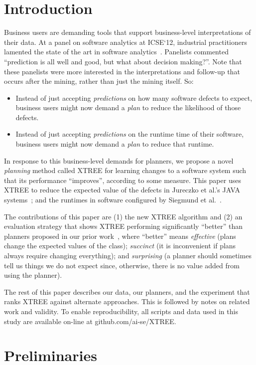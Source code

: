 \documentclass{sig-alternate}
\newcommand{\bi}{\begin{itemize}}
\newcommand{\ei}{\end{itemize}}
\begin{document}
\section{Introduction}
Business users are demanding  tools that support    business-level interpretations of their data. At a panel on software analytics at ICSE`12, industrial practitioners lamented the state of the art in software analytics~\cite{menzies12a}. Panelists commented  ``prediction is all well and good, but what about decision making?''. Note that these panelists were more interested in the interpretations and follow-up that occurs after the mining, rather than just the mining itself. So:
\bi
\item
Instead of just accepting {\em predictions} on how many software defects to expect, business users might now demand a {\em plan} to reduce the likelihood of those defects.
\item
Instead of just accepting {\em predictions} on the runtime time of their software, business users might now demand a {\em plan} to reduce that runtime. 
\ei
In response to this business-level demands for planners,
we propose a novel {\em planning} method called XTREE for learning changes to a software system
such that its performance ``improves'', according to some measure. This paper uses XTREE
to reduce  the expected value of the
defects     in Jureczko et al.'s    JAVA systems~\cite{jureczko10};
and the runtimes   in   software    configured by  Siegmund et al.~\cite{sven12}.

The contributions of this paper are (1)  
    the new XTREE    algorithm and (2) an evaluation strategy that shows
 XTREE performing significantly ``better'' than    planners  proposed in our prior   work~\cite{me12c,krishna15},
 where ``better'' means 
{\em effective} (plans change the  expected values of the class);
{\em succinct} (it is inconvenient if  plans   always require changing  everything);
and {\em surprising} (a planner should sometimes tell us things we do not expect
since, otherwise,
there is no value added from  using the planner).

The rest of this paper   describes our data, our planners, and the experiment that
ranks XTREE against alternate approaches.  This is followed by notes on related work
and validity.
To enable reproducibility, all scripts and data used in this 
study are available on-line at github.com/ai-se/XTREE.

\section{Preliminaries}\label{sect:prelim}
\end{document}

